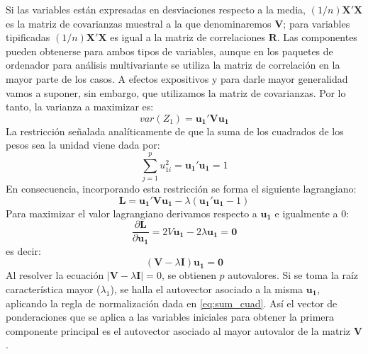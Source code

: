 \begin{enumerate}
\begin{enumerate}
\begin{equation}
            \label{eq:var_matriz}
        \end{equation}
        Si las variables están expresadas en desviaciones respecto a la media, $(1/n)\mathbf{X'X}$ es la matriz de covarianzas muestral a la que denominaremos $\mathbf{V}$; para variables tipificadas $(1/n)\mathbf{X'X}$ es igual a la matriz de correlaciones $\mathbf{R}$. Las componentes pueden obtenerse para ambos tipos de variables, aunque en los paquetes de ordenador para análisis multivariante se utiliza la matriz de correlación en la mayor parte de los casos. A efectos expositivos y para darle mayor generalidad vamos a suponer, sin embargo, que utilizamos la matriz de covarianzas. Por lo tanto, la varianza a maximizar es:
        \begin{equation}
            var(Z_1)=\mathbf{u_1'Vu_1}
            \label{eq:var_matriz}
        \end{equation}
        La restricción señalada analíticamente de que la suma de los cuadrados de los pesos sea la unidad viene dada por:
        \begin{equation}
            \sum\limits_{j = 1}^{p}{u}_{1i}^{2}=\mathbf{u_1'u_1}=1
            \label{eq:sum_cuad}
        \end{equation}
        En consecuencia, incorporando esta restricción se forma el siguiente lagrangiano:
        \begin{equation}
            \mathbf{L}=\mathbf{u_1'Vu_1}-\lambda(\mathbf{u_1'u_1}-1)
        \end{equation}
        Para maximizar el valor lagrangiano derivamos respecto a $\mathbf{u_1}$ e igualmente a 0:
        \begin{equation}
            \frac{\partial \mathbf{L}}{\partial \mathbf{u_1}}=2V\mathbf{u_1}-2\lambda \mathbf{u_1}=\mathbf{0}
        \end{equation}
        es decir:
        \begin{equation}
            (\mathbf{V}-\lambda \mathbf{I})\mathbf{u_1}=\mathbf{0}
        \end{equation}
        Al resolver la ecuación $|\mathbf{V}-\lambda \mathbf{I}|=0$, se obtienen $p$ autovalores. Si se toma la raíz característica mayor ($\lambda_1$), se halla el autovector asociado a la misma $\mathbf{u_1}$, aplicando la regla de normalización dada en \eqref{eq:sum_cuad}. Así el vector de ponderaciones que se aplica a las variables iniciales para obtener la primera componente principal es el autovector asociado al mayor autovalor de la matriz $\mathbf{V}$.


\end{enumerate}
\end{enumerate}
